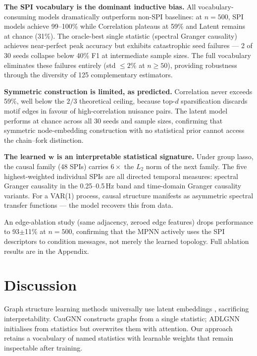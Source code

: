 \documentclass{article}
\theoremstyle{plain}
\begin{document}
\textbf{The SPI vocabulary is the dominant inductive bias.} All vocabulary-consuming models dramatically outperform non-SPI baselines: at $n{=}500$, SPI models achieve 99--100\% while Correlation plateaus at 59\% and Latent remains at chance (31\%). The oracle-best single statistic (spectral Granger causality) achieves near-perfect peak accuracy but exhibits catastrophic seed failures --- 2 of 30 seeds collapse below 40\% F1 at intermediate sample sizes. The full vocabulary eliminates these failures entirely (std $\leq 2$\% at $n \geq 50$), providing robustness through the diversity of 125 complementary estimators.

\textbf{Symmetric construction is limited, as predicted.} Correlation never exceeds 59\%, well below the $2/3$ theoretical ceiling, because top-$d$ sparsification discards motif edges in favour of high-correlation nuisance pairs. The latent model performs at chance across all 30 seeds and sample sizes, confirming that symmetric node-embedding construction with no statistical prior cannot access the chain--fork distinction.

\textbf{The learned $\mathbf{w}$ is an interpretable statistical signature.} Under group lasso, the causal family (48 SPIs) carries $6\times$ the $L_2$ norm of the next family. The five highest-weighted individual SPIs are all directed temporal measures: spectral Granger causality in the 0.25--0.5\,Hz band and time-domain Granger causality variants. For a VAR(1) process, causal structure manifests as asymmetric spectral transfer functions --- the model recovers this from data.

An edge-ablation study (same adjacency, zeroed edge features) drops performance to 93$\pm$11\% at $n{=}500$, confirming that the MPNN actively uses the SPI descriptors to condition messages, not merely the learned topology. Full ablation results are in the Appendix.

\section{Discussion}
\label{sec:discussion}

Graph structure learning methods universally use latent embeddings \citep{zhu2021}, sacrificing interpretability. CauGNN \citep{duan2023} constructs graphs from a single statistic; ADLGNN \citep{sriramulu2023} initialises from statistics but overwrites them with attention. Our approach retains a vocabulary of named statistics with learnable weights that remain inspectable after training.
\end{document}
